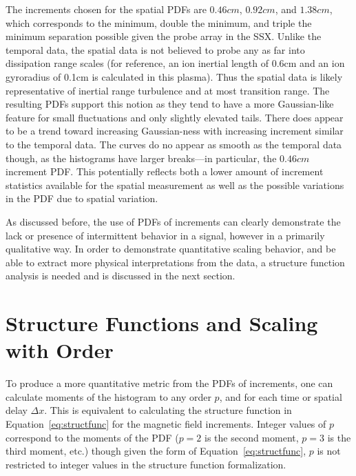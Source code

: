 \documentclass[aps,prl,amsmath,amssymb,reprint,superscriptaddress]{revtex4-1} %
\begin{document}
The increments chosen for the spatial PDFs are $0.46cm$, $0.92cm$, and $1.38cm$, which corresponds to the minimum, double the minimum, and triple the minimum separation possible given the probe array in the SSX. Unlike the temporal data, the spatial data is not believed to probe any as far into dissipation range scales (for reference, an ion inertial length of 0.6cm  and an ion gyroradius of 0.1cm is calculated in this plasma). Thus the spatial data is likely representative of inertial range turbulence and at most transition range. The resulting PDFs support this notion as they tend to have a more Gaussian-like feature for small fluctuations and only slightly elevated tails. There does appear to be a trend toward increasing Gaussian-ness with increasing increment similar to the temporal data. The curves do no appear as smooth as the temporal data though, as the histograms have larger breaks---in particular, the $0.46cm$ increment PDF. This potentially reflects both a lower amount of increment statistics available for the spatial measurement as well as the possible variations in the PDF due to spatial variation. 

As discussed before, the use of PDFs of increments can clearly demonstrate the lack or presence of intermittent behavior in a signal, however in a primarily qualitative way. In order to demonstrate quantitative scaling behavior, and be able to extract more physical interpretations from the data, a structure function analysis is needed and is discussed in the next section.

\section{Structure Functions and Scaling with Order}\label{sec:structs}

To produce a more quantitative metric from the PDFs of increments, one can calculate moments of the histogram to any order $p$, and for each time or spatial delay $\Delta x$. This is equivalent to calculating the structure function in Equation~\ref{eq:structfunc} for the magnetic field increments. Integer values of $p$ correspond to the moments of the PDF ($p=2$ is the second moment, $p=3$ is the third moment, etc.) though given the form of Equation~\ref{eq:structfunc}, $p$ is not restricted to integer values in the structure function formalization.
\end{document}
